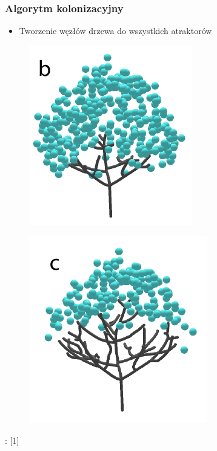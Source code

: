 \documentclass[blue,table]{beamer}
\begin{document}
\begin{frame}\frametitle{Algorytm kolonizacyjny}
\begin{itemize}
\item{Tworzenie węzłów drzewa do wszystkich atraktorów}
\end{itemize}
\begin{multicols}{2}
\begin{figure}
\includegraphics[scale=0.5]{img/colonization/colonization_2.png} 
\end{figure}
\begin{figure}
\includegraphics[scale=0.5]{img/colonization/colonization_3.png} 
\end{figure}
\end{multicols}
\begin{footnotesize}
: [1]
\end{footnotesize}
\end{frame}
\end{document}
